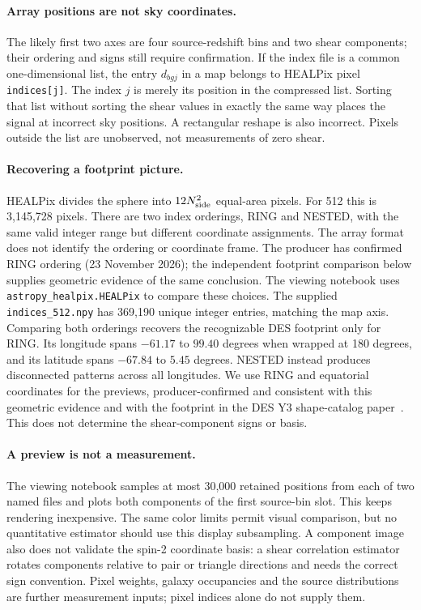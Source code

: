 \documentclass[11pt]{article}
\begin{document}
\paragraph{Array positions are not sky coordinates.}
The likely first two axes are four source-redshift bins and two shear
components; their ordering and signs still require confirmation. If the
index file is a common one-dimensional list, the entry $d_{bgj}$ in a map
belongs to HEALPix pixel \texttt{indices[j]}. The index $j$ is merely its
position in the compressed list. Sorting that list without sorting the
shear values in exactly the same way places the signal at incorrect sky
positions. A rectangular reshape is also incorrect. Pixels outside the list
are unobserved, not measurements of zero shear.

\paragraph{Recovering a footprint picture.}
HEALPix divides the sphere into $12N_{\rm side}^2$ equal-area pixels. For 512
this is 3,145,728 pixels. There are two index orderings, RING and NESTED,
with the same valid integer range but different coordinate assignments.
The array format does not identify the ordering or coordinate frame.
The producer has confirmed RING ordering (23 November 2026); the independent
footprint comparison below supplies geometric evidence of the same
conclusion. The viewing notebook uses \texttt{astropy\_healpix.HEALPix} to compare these choices. The supplied \texttt{indices\_512.npy} has 369,190 unique integer entries,
matching the map axis. Comparing both orderings recovers the recognizable
DES footprint only for RING. Its longitude spans $-61.17$ to $99.40$ degrees
when wrapped at 180 degrees, and its latitude spans $-67.84$ to $5.45$ degrees.
NESTED instead produces disconnected patterns across all longitudes.
We use RING and equatorial coordinates for the previews, producer-confirmed
and consistent with this geometric evidence and with the footprint in the
DES Y3 shape-catalog paper~\cite{gatti}. This does not determine the
shear-component signs or basis.

\paragraph{A preview is not a measurement.}
The viewing notebook samples at most 30,000 retained positions from each of
two named files and plots both components of the first source-bin slot.
This keeps rendering inexpensive. The same color limits permit visual
comparison, but no quantitative estimator should use this display
subsampling. A component image also does not validate the spin-2 coordinate
basis: a shear correlation estimator rotates components relative to pair
or triangle directions and needs the correct sign convention. Pixel weights,
galaxy occupancies and the source distributions are further measurement
inputs; pixel indices alone do not supply them.
\end{document}
